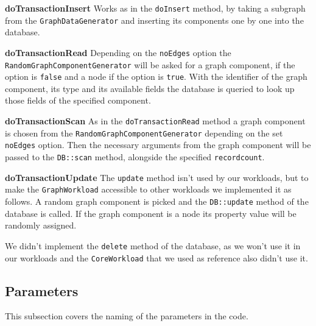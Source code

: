 \textbf{doTransactionInsert} \newline
Works as in the \texttt{doInsert} method,
by taking a subgraph from the \texttt{GraphDataGenerator} and inserting its components one by one into the database.

\textbf{doTransactionRead} \newline
Depending on the \texttt{noEdges} option the \texttt{RandomGraphComponentGenerator} will be asked for a graph component,
if the option is \texttt{false} and a node if the option is \texttt{true}.
With the identifier of the graph component,
its type and its available fields the database is queried to look up those fields of the specified component.

\textbf{doTransactionScan} \newline
As in the \texttt{doTransactionRead} method a graph component is chosen from the \texttt{RandomGraphComponentGenerator} depending on the set \texttt{noEdges} option.
Then the necessary arguments from the graph component will be passed to the \texttt{DB::scan} method,
alongside the specified \texttt{recordcount}.

\textbf{doTransactionUpdate} \newline
The \texttt{update} method isn't used by our workloads,
but to make the \texttt{GraphWorkload} accessible to other workloads we implemented it as follows.
A random graph component is picked and the \texttt{DB::update} method of the database is called.
If the graph component is a node its property value will be randomly assigned.

We didn't implement the \texttt{delete} method of the database,
as we won't use it in our workloads and the \texttt{CoreWorkload} that we used as reference also didn't use it.

\subsection{Parameters}
This subsection covers the naming of the parameters in the code.

